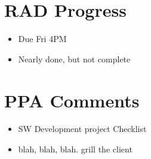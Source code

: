 
\date{22nd August, 2011}
\apologies{}


\maketitle{}


\section{RAD Progress}
\begin{itemize}
 \item{Due Fri 4PM}
 \item{Nearly done, but not complete}
\end{itemize}

\section{PPA Comments}
\begin{itemize}
 \item{SW Development project Checklist}
 \item{blah, blah, blah. grill the client}
\end{itemize}





